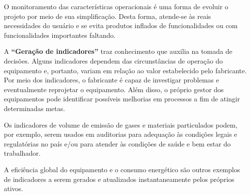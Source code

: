 O monitoramento das características operacionais é uma forma de evoluir o projeto por meio de sua simplificação. Desta forma, atende-se às reais necessidades do usuário e se evita produtos inflados de funcionalidades ou com funcionalidades importantes faltando.

A \textbf{``Geração de indicadores''} traz conhecimento que auxilia na tomada de decisões. Alguns indicadores dependem das circunstâncias de operação do equipamento e, portanto, variam em relação ao valor estabelecido pelo fabricante. Por meio dos indicadores, o fabricante é capaz de investigar problemas e eventualmente reprojetar o equipamento. Além disso, o próprio gestor dos equipamentos pode identificar possíveis melhorias em processos a fim de atingir determinadas metas.

Os indicadores de volume de emissão de gases e materiais particulados podem, por exemplo, serem usados em auditorias para adequação às condições legais e regulatórias no país e/ou para atender às condições de saúde e bem estar do trabalhador.

A eficiência global do equipamento e o consumo energético são outros exemplos de indicadores a serem gerados e atualizados instantaneamente pelos próprios ativos.
